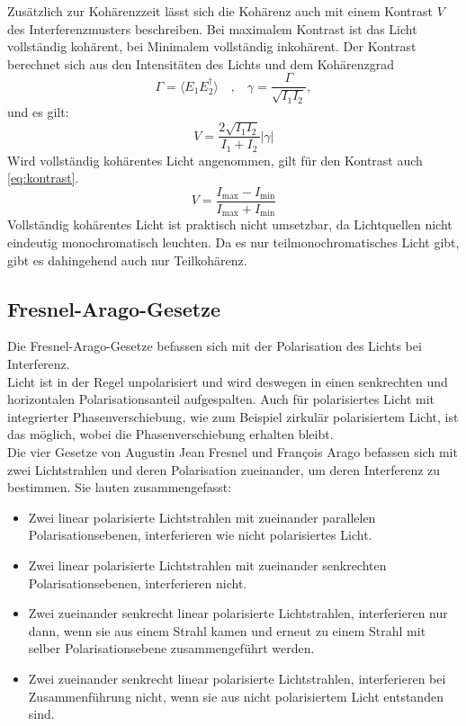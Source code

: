 Zusätzlich zur Kohärenzzeit lässt sich die Kohärenz auch mit einem Kontrast $V$ des Interferenzmusters beschreiben.
Bei maximalem Kontrast ist das Licht vollständig kohärent, bei Minimalem vollständig inkohärent.
Der Kontrast berechnet sich aus den Intensitäten des Lichts und dem Kohärenzgrad
\begin{equation}
    \Gamma = \langle E_1 E_2^\dagger \rangle \quad \text{,} \quad \gamma = \frac{\Gamma}{\sqrt{I_1 I_2}},
    \label{eq:grad}
\end{equation}
und es gilt:
\begin{equation}
    V = \frac{2\sqrt{I_1I_2}}{I_1 + I_2}|\gamma|
    \label{eq:kontrast_formel}
\end{equation}
Wird vollständig kohärentes Licht angenommen, gilt für den Kontrast auch \autoref{eq:kontrast}.
\begin{equation}
    V = \frac{I_{\text{max}} - I_{\text{min}}}{I_{\text{max}} + I_{\text{min}}}
    \label{eq:kontrast}
\end{equation}
Vollständig kohärentes Licht ist praktisch nicht umsetzbar, da Lichtquellen nicht eindeutig monochromatisch leuchten.
Da es nur teilmonochromatisches Licht gibt, gibt es dahingehend auch nur Teilkohärenz.

\subsection{Fresnel-Arago-Gesetze}
Die Fresnel-Arago-Gesetze befassen sich mit der Polarisation des Lichts bei Interferenz.\\
Licht ist in der Regel unpolarisiert und wird deswegen in einen senkrechten und horizontalen Polarisationsanteil aufgespalten.
Auch für polarisiertes Licht mit integrierter Phasenverschiebung, wie zum Beispiel zirkulär polarisiertem Licht, ist das möglich, wobei die Phasenverschiebung erhalten bleibt.\\
Die vier Gesetze von Augustin Jean Fresnel und François Arago befassen sich mit zwei Lichtstrahlen und deren Polarisation zueinander, um deren Interferenz zu bestimmen.
Sie lauten zusammengefasst:
\begin{itemize}
    \item Zwei linear polarisierte Lichtstrahlen mit zueinander parallelen Polarisationsebenen, interferieren wie nicht polarisiertes Licht.
    \item Zwei linear polarisierte Lichtstrahlen mit zueinander senkrechten Polarisationsebenen, interferieren nicht.
    \item Zwei zueinander senkrecht linear polarisierte Lichtstrahlen, interferieren nur dann, wenn sie aus einem Strahl kamen und erneut zu einem Strahl mit selber Polarisationsebene zusammengeführt werden.
    \item Zwei zueinander senkrecht linear polarisierte Lichtstrahlen, interferieren bei Zusammenführung nicht, wenn sie aus nicht polarisiertem Licht entstanden sind.\cite{fresnel}
\end{itemize}


